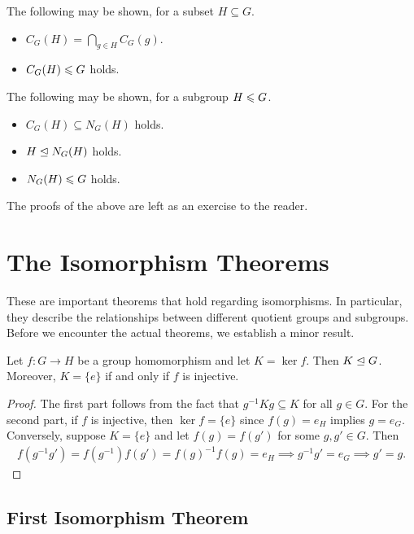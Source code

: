 \begin{remark}
    The following may be shown, for a subset $H \subseteq G$.
    \begin{itemize}
        \item $C_{G}(H) = \bigcap_{g \in H} C_{G}(g)$.
        \item $C_{G}(H) \leqslant G$ holds.
    \end{itemize}
    The following may be shown, for a subgroup $H \leqslant G$.
    \begin{itemize}
        \item $C_{G}(H) \subseteq N_{G}(H)$ holds.
        \item $H \trianglelefteq N_{G}(H)$ holds.
        \item $N_{G}(H) \leqslant G$ holds.
    \end{itemize}
\end{remark}

The proofs of the above are left as an exercise to the reader.

\section{The Isomorphism Theorems}

These are important theorems that hold regarding isomorphisms. In particular, they describe the relationships between different quotient groups and subgroups. Before we encounter the actual theorems, we establish a minor result.

\begin{proposition}
    Let $f:G \to H$ be a group homomorphism and let $K = \ker f$. Then $K \trianglelefteq G$. Moreover, $K = \{e\}$ if and only if $f$ is injective.
\end{proposition}
\begin{proof}
    The first part follows from the fact that $g^{-1}Kg \subseteq K$ for all $g \in G$. For the second part, if $f$ is injective, then $\ker f = \{e\}$ since $f(g) = e_{H}$ implies $g = e_{G}$. Conversely, suppose $K = \{e\}$ and let $f(g) = f(g')$ for some $g,g' \in G$. Then
    \begin{align}
        f(g^{-1}g') = f(g^{-1})f(g') = f(g)^{-1}f(g) = e_{H} \implies g^{-1}g' = e_{G} \implies g' = g.
    \end{align}
\end{proof}

\subsection{First Isomorphism Theorem}

